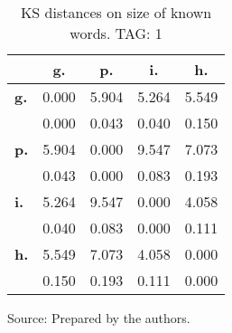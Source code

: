 \begin{table}[h!]
\begin{center}
\caption{KS distances on size of known words. TAG: 1}
\begin{tabular}{| l || c | c | c | c |}\hline
 & {\bf g.} & {\bf p.} & {\bf i.} & {\bf h.} \\\hline\hline
{\bf g.} & 0.000 & 5.904 & 5.264 & 5.549 \\
{\bf } & 0.000 & 0.043 & 0.040 & 0.150 \\\hline
{\bf p.} & 5.904 & 0.000 & 9.547 & 7.073 \\
{\bf } & 0.043 & 0.000 & 0.083 & 0.193 \\\hline
{\bf i.} & 5.264 & 9.547 & 0.000 & 4.058 \\
{\bf } & 0.040 & 0.083 & 0.000 & 0.111 \\\hline
{\bf h.} & 5.549 & 7.073 & 4.058 & 0.000 \\
{\bf } & 0.150 & 0.193 & 0.111 & 0.000 \\\hline
\end{tabular}
\begin{flushleft}
		Source: Prepared by the authors.\
\end{flushleft}
\end{center}
\end{table} 
